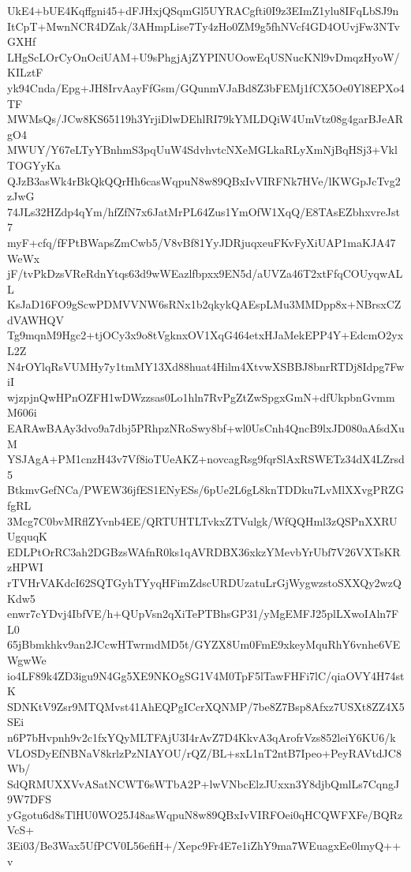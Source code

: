 UkE4+bUE4Kqffgni45+dFJHxjQSqmGl5UYRACgfti0I9z3EImZ1ylu8IFqLbSJ9n
ItCpT+MwnNCR4DZak/3AHmpLise7Ty4zHo0ZM9g5fhNVcf4GD4OUvjFw3NTvGXHf
LHgScLOrCyOnOciUAM+U9sPhgjAjZYPINUOowEqUSNucKNl9vDmqzHyoW/KILztF
yk94Cnda/Epg+JH8IrvAayFfGsm/GQunmVJaBd8Z3bFEMj1fCX5Oe0Yl8EPXo4TF
MWMsQs/JCw8KS65119h3YrjiDlwDEhlRI79kYMLDQiW4UmVtz08g4garBJeARgO4
MWUY/Y67eLTyYBnhmS3pqUuW4SdvhvtcNXeMGLkaRLyXmNjBqHSj3+VklTOGYyKa
QJzB3asWk4rBkQkQQrHh6casWqpuN8w89QBxIvVIRFNk7HVe/lKWGpJcTvg2zJwG
74JLs32HZdp4qYm/hfZfN7x6JatMrPL64Zus1YmOfW1XqQ/E8TAsEZbhxvreJst7
myF+cfq/fFPtBWapsZmCwb5/V8vBf81YyJDRjuqxeuFKvFyXiUAP1maKJA47WeWx
jF/tvPkDzsVReRdnYtqs63d9wWEazlfbpxx9EN5d/aUVZa46T2xtFfqCOUyqwALL
KsJaD16FO9gScwPDMVVNW6sRNx1b2qkykQAEspLMu3MMDpp8x+NBrsxCZdVAWHQV
Tg9mqnM9Hgc2+tjOCy3x9o8tVgknxOV1XqG464etxHJaMekEPP4Y+EdcmO2yxL2Z
N4rOYlqRsVUMHy7y1tmMY13Xd88huat4Hilm4XtvwXSBBJ8bnrRTDj8Idpg7FwiI
wjzpjnQwHPnOZFH1wDWzzsas0Lo1hln7RvPgZtZwSpgxGmN+dfUkpbnGvmmM606i
EARAwBAAy3dvo9a7dbj5PRhpzNRoSwy8bf+wl0UsCnh4QncB9lxJD080aAfsdXuM
YSJAgA+PM1cnzH43v7Vf8ioTUeAKZ+novcagRsg9fqrSlAxRSWETz34dX4LZrsd5
BtkmvGefNCa/PWEW36jfES1ENyESs/6pUe2L6gL8knTDDku7LvMlXXvgPRZGfgRL
3Mcg7C0bvMRflZYvnb4EE/QRTUHTLTvkxZTVulgk/WfQQHml3zQSPnXXRUUgquqK
EDLPtOrRC3ah2DGBzsWAfnR0ks1qAVRDBX36xkzYMevbYrUbf7V26VXTsKRzHPWI
rTVHrVAKdcI62SQTGyhTYyqHFimZdscURDUzatuLrGjWygwzstoSXXQy2wzQKdw5
enwr7cYDvj4IbfVE/h+QUpVsn2qXiTePTBhsGP31/yMgEMFJ25plLXwoIAln7FL0
65jBbmkhkv9an2JCcwHTwrmdMD5t/GYZX8Um0FmE9xkeyMquRhY6vnhe6VEWgwWe
io4LF89k4ZD3igu9N4Gg5XE9NKOgSG1V4M0TpF5lTawFHFi7lC/qiaOVY4H74stK
SDNKtV9Zsr9MTQMvst41AhEQPgICcrXQNMP/7be8Z7Bsp8Afxz7USXt8ZZ4X5SEi
n6P7bHvpnh9v2c1fxYQyMLTFAjU3I4rAvZ7D4KkvA3qArofrVzs852leiY6KU6/k
VLOSDyEfNBNaV8krlzPzNIAYOU/rQZ/BL+sxL1nT2ntB7Ipeo+PeyRAVtdJC8Wb/
SdQRMUXXVvASatNCWT6sWTbA2P+lwVNbcElzJUxxn3Y8djbQmlLs7CqngJ9W7DFS
yGgotu6d8sTlHU0WO25J48asWqpuN8w89QBxIvVIRFOei0qHCQWFXFe/BQRzVcS+
3Ei03/Be3Wax5UfPCV0L56efiH+/Xepc9Fr4E7e1iZhY9ma7WEuagxEe0lmyQ++v
